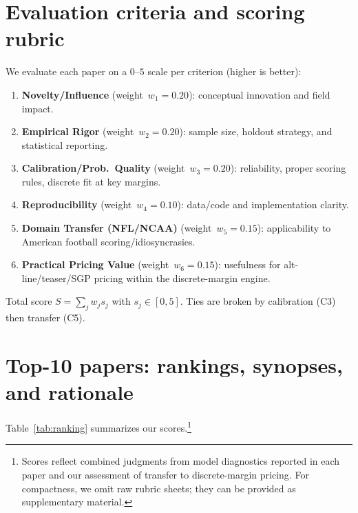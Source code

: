 \documentclass[11pt]{amsart}
\begin{document}
\section{Evaluation criteria and scoring rubric}\label{sec:criteria}
We evaluate each paper on a $0$--$5$ scale per criterion (higher is better):
\begin{enumerate}[leftmargin=2em,label=\textbf{C\arabic*.}]
\item \textbf{Novelty/Influence} (weight~$w_1{=}0.20$): conceptual innovation and field impact.
\item \textbf{Empirical Rigor} (weight~$w_2{=}0.20$): sample size, holdout strategy, and statistical reporting.
\item \textbf{Calibration/Prob.\ Quality} (weight~$w_3{=}0.20$): reliability, proper scoring rules, discrete fit at key margins.
\item \textbf{Reproducibility} (weight~$w_4{=}0.10$): data/code and implementation clarity.
\item \textbf{Domain Transfer (NFL/NCAA)} (weight~$w_5{=}0.15$): applicability to American football scoring/idiosyncrasies.
\item \textbf{Practical Pricing Value} (weight~$w_6{=}0.15$): usefulness for alt-line/teaser/SGP pricing within the discrete-margin engine.
\end{enumerate}
Total score $S=\sum_j w_j s_j$ with $s_j\in[0,5]$. Ties are broken by calibration (C3) then transfer (C5).

\section{Top-10 papers: rankings, synopses, and rationale}
Table~\ref{tab:ranking} summarizes our scores.\footnote{Scores reflect combined judgments from model diagnostics reported in each paper and our assessment of transfer to discrete-margin pricing. For compactness, we omit raw rubric sheets; they can be provided as supplementary material.}
\end{document}
